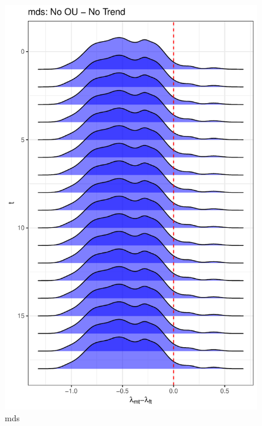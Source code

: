 \documentclass[
  12pt,
]{article}
\begin{document}
\begin{figure}

{\centering \includegraphics[width=0.9\linewidth]{../Figures/mds/lambda_diff} 

}

\caption{mds}\label{fig:unnamed-chunk-18}
\end{figure}
\end{document}

